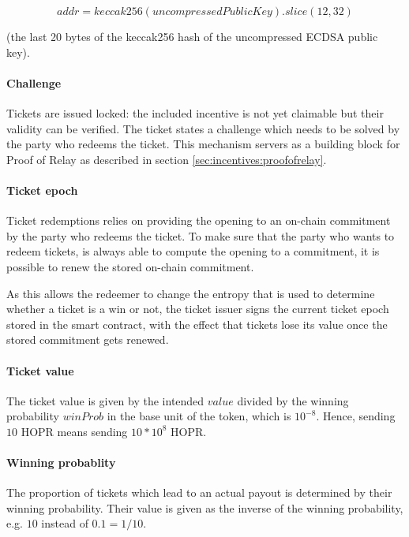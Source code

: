 $$ addr = keccak256( uncompressedPublicKey).slice(12,32)$$

(the last 20 bytes of the keccak256 hash of the uncompressed ECDSA public key).

\paragraph{Challenge}
\label{sec:tickets:issuance:challenge}

Tickets are issued locked: the included incentive is not yet claimable but their validity can be verified. The ticket states a challenge which needs to be solved by the party who redeems the ticket. This mechanism servers as a building block for Proof of Relay as described in section \ref{sec:incentives:proofofrelay}.

\paragraph{Ticket epoch}
\label{sec:tickets:issuance:ticketepoch}

Ticket redemptions relies on providing the opening to an on-chain commitment by the party who redeems the ticket. To make sure that the party who wants to redeem tickets, is always able to compute the opening to a commitment, it is possible to renew the stored on-chain commitment.

As this allows the redeemer to change the entropy that is used to determine whether a ticket is a win or not, the ticket issuer signs the current ticket epoch stored in the smart contract, with the effect that tickets lose its value once the stored commitment gets renewed.

\paragraph{Ticket value}
\label{sec:tickets:issuance:ticketvalue}

The ticket value is given by the intended $value$ divided by the winning probability $winProb$ in the base unit of the token, which is $10^{-8}$. Hence, sending $10$ HOPR means sending $10 * 10^8$ HOPR.

\paragraph{Winning probablity}
\label{sec:tickets:issuance:winningprobability}

The proportion of tickets which lead to an actual payout is determined by their winning probability. Their value is given as the inverse of the winning probability, e.g. $10$ instead of $0.1 = 1/10$.

